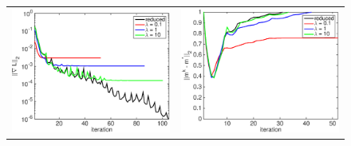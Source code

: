 \documentclass{iopart}
\begin{document}
\begin{figure}
\centering
\begin{tabular}{cc}
\includegraphics[scale=.3]{./figs/2D_exp4_b}&
\includegraphics[scale=.3]{./figs/2D_exp4_c}\\
\end{tabular}
\centering
\begin{tabular}{cccc}

\end{tabular}
\end{figure}
\end{document}

